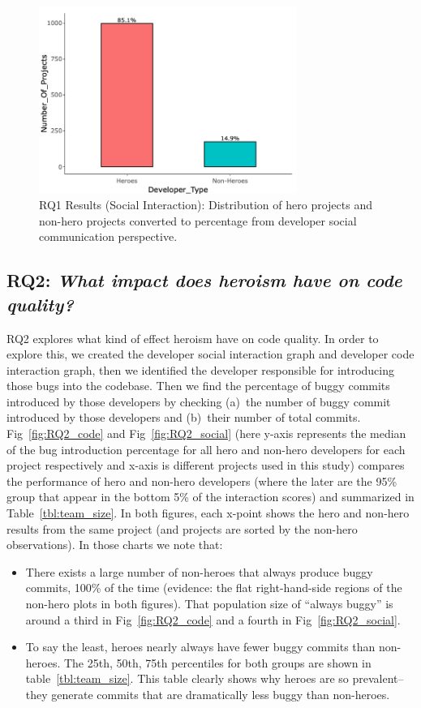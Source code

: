 \documentclass[sigconf,review]{acmart}
\newcommand{\bi}{\begin{itemize}}
\newcommand{\ei}{\end{itemize}}
\begin{document}
\begin{figure}
\includegraphics[width=\linewidth, height =6.1cm]{RQ1_Social.png}
\caption{RQ1 Results  (Social Interaction): Distribution of hero projects and non-hero projects converted to percentage from developer social communication perspective.}
\label{fig:RQ2_following}
\end{figure}


\subsection{\textbf{RQ2:} \textit{What impact does heroism have on code quality?}}
\label{sec:RQ2}



RQ2 explores what kind of effect heroism have on code quality. In order to explore this, we created the developer social interaction graph and developer code interaction graph, then we identified the developer responsible for introducing those bugs into the codebase. Then we find the percentage of buggy commits introduced by those developers by checking (a)~the number of buggy commit introduced by those developers and (b)~their number of total commits.\\

Fig~\ref{fig:RQ2_code} and Fig~\ref{fig:RQ2_social} (here y-axis represents the median of the bug introduction percentage for all hero and non-hero developers for each project respectively and x-axis is different projects used in this study) compares the performance of hero and non-hero developers
(where the later are the 95\% group that appear in the bottom 5\% of the interaction scores) and summarized in Table~\ref{tbl:team_size}. In both figures,
each x-point shows the hero and non-hero results from the same project (and 
projects are sorted by the non-hero observations). In those charts we note that:
\bi
\item
There exists a large number of non-heroes that always produce buggy commits, 100\% of the time (evidence: the flat right-hand-side regions of the non-hero plots in both figures). That population size of ``always buggy'' is around a third in 
Fig~\ref{fig:RQ2_code} and a fourth in Fig~\ref{fig:RQ2_social}.
\item
To say the least, heroes nearly always have fewer buggy commits than non-heroes. The 25th, 50th, 75th percentiles for both groups are
shown in table~\ref{tbl:team_size}. This table clearly shows why heroes are so  prevalent-- they generate commits that are dramatically
less buggy than non-heroes.
\ei
\end{document}
